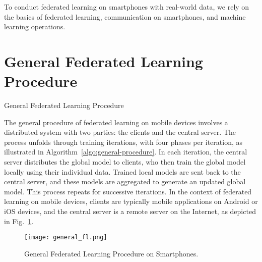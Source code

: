 To conduct federated learning on smartphones with real-world data,
we rely on the basics of federated learning, communication on smartphones,
and machine learning operations.

\section{General Federated Learning Procedure}

\begin{algorithm}
    \caption{General Federated Learning Procedure}
    \label{algo:general-procedure}
\end{algorithm}

The general procedure of federated learning on mobile devices involves a
distributed system with two parties: the clients and the central server.
The process unfolds through training iterations, with four phases per iteration,
as illustrated in Algorithm~\ref{algo:general-procedure}. In each iteration,
the central server distributes the global model to clients,
who then train the global model locally using their individual data.
Trained local models are sent back to the central server,
and these models are aggregated to generate an updated global model.
This process repeats for successive iterations.
In the context of federated learning on mobile devices,
clients are typically mobile applications on Android or iOS devices,
and the central server is a remote server on the Internet,
as depicted in Fig.~\ref{fig:general-fl}.

\begin{figure}\begin{center}
        \texttt{[image: general\_fl.png]}
        \caption{General Federated Learning Procedure on Smartphones.}
        \label{fig:general-fl}
    \end{center}\end{figure}

